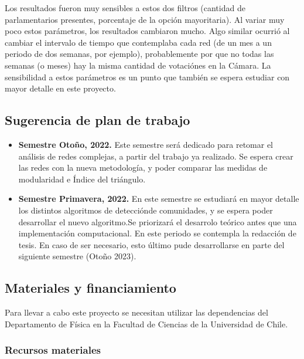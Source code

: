 \documentclass{proyectotesis}
\begin{document}
Los resultados fueron muy sensibles a estos dos filtros (cantidad de parlamentarios presentes, porcentaje de la opción mayoritaria). Al variar muy poco estos parámetros, los resultados cambiaron mucho. Algo similar ocurrió al cambiar el intervalo de tiempo que contemplaba cada red (de un mes a un periodo de dos semanas, por ejemplo), probablemente por que no todas las semanas (o meses) hay la misma cantidad de votaciónes en la Cámara. La sensibilidad a estos parámetros es un punto que también se espera estudiar con mayor detalle en este proyecto. 



\subsection{Sugerencia de plan de trabajo}
\begin{itemize}
\item \textbf{Semestre Otoño, 2022.} Este semestre será dedicado para retomar el análisis de redes complejas, a partir del trabajo ya realizado. Se espera crear las redes con la nueva metodología, y poder comparar las medidas de modularidad e Índice del triángulo.

\item \textbf{Semestre Primavera, 2022.} En este semestre se estudiará en mayor detalle los distintos algoritmos de detecciónde comunidades, y se espera poder desarrollar el nuevo algoritmo.Se priorizará el desarrolo teórico antes que una implementación computacional.
En este periodo se contempla la redacción de tesis. En caso de ser necesario, esto último pude desarrollarse en parte del siguiente semestre (Otoño 2023). 
\end{itemize}

\subsection{Materiales y financiamiento}

Para llevar a cabo este proyecto se necesitan utilizar las dependencias del Departamento de Física en la Facultad de Ciencias de la Universidad de Chile. %

\subsubsection*{Recursos materiales}
\end{document}
